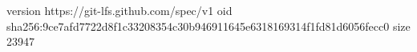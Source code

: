 version https://git-lfs.github.com/spec/v1
oid sha256:9ce7afd7722d8f1c33208354c30b946911645e6318169314f1fd81d6056fecc0
size 23947
